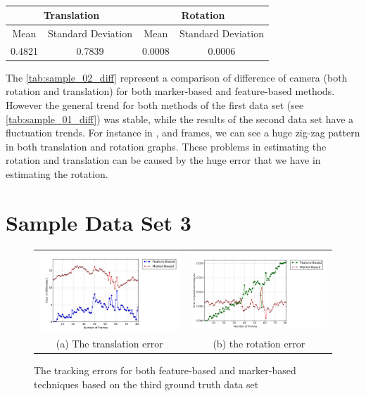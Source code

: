\begin{table}[H]
\centering
  \begin{tabular}{| c | c | c | c |}
      \hline
      \multicolumn{2}{|c|}{Translation} & \multicolumn{2}{c}{Rotation} \\ \hline
       Mean & Standard Deviation & Mean & Standard Deviation \\ \hline
      0.4821 & 0.7839 & 0.0008 & 0.0006 \\ \hline
  \end{tabular}
  \caption{} \label{tab:sample_02_diff}
\end{table}

The \autoref{tab:sample_02_diff} represent a comparison of difference of camera (both rotation and translation) for both marker-based and feature-based methods. However the general trend for both methods of the first data set (see \autoref{tab:sample_01_diff}) was stable, while the results of the second data set have a fluctuation trends. For instance in ,  and  frames, we can see a huge zig-zag pattern in both translation and rotation graphs. These problems in estimating the rotation and translation can be caused by the huge error that we have in estimating the rotation. 

\section{Sample Data Set 3} \label{subsec:sample_3}
\begin{figure}[H]
\begin{tabular}{cc}
  \includegraphics[width=80mm]{figures/frame_600/graph_translation} &  \includegraphics[width=80mm]{figures/frame_600/graph_rotation} \\
(a) The translation error & (b) the rotation error \\[6pt]
\end{tabular}
\caption{The tracking errors for both feature-based and marker-based techniques based on the third ground truth data set}\label{fig:sample_03}
\end{figure}


